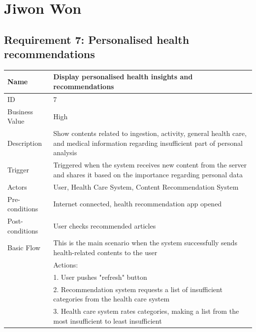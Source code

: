 \documentclass{article}
\begin{document}
		\section{Jiwon Won}
		\subsection{Requirement 7: Personalised health recommendations}
		
		\begin{table}[htbp]
			\centering
			\small
			\begin{tabularx}{\textwidth}{|>{\raggedright\arraybackslash}p{}|X|}
				\hline
				Name             & Display personalised health insights and recommendations                                \\ \hline
				ID               & 7                                                                                       \\ \hline
				Business Value   & High                                                                                    \\ \hline
				Description      & Show contents related to ingestion, activity, general health care, and medical information regarding insufficient part of personal analysis \\ \hline
				Trigger          & Triggered when the system receives new content from the server and shares it based on the importance regarding personal data \\ \hline
				Actors           & User, Health Care System, Content Recommendation System                                 \\ \hline
				Pre-conditions   & Internet connected, health recommendation app opened                                    \\ \hline
				Post-conditions  & User checks recommended articles                                                         \\ \hline
				Basic Flow       & This is the main scenario when the system successfully sends health-related contents to the user \\ \hline
								 & Actions: \\
								 & 1. User pushes "refresh" button \\
								 & 2. Recommendation system requests a list of insufficient categories from the health care system \\
								 & 3. Health care system rates categories, making a list from the most insufficient to least insufficient \\

\end{tabularx}
\end{table}
\end{document}
